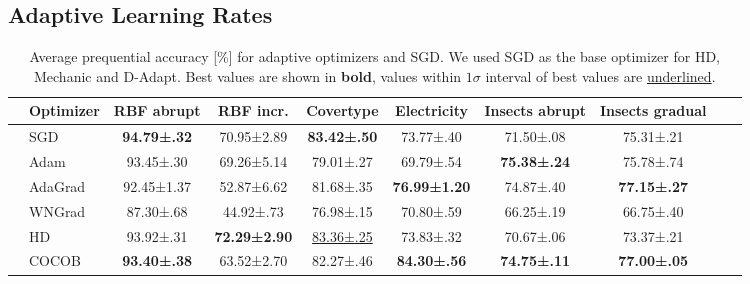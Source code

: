 \documentclass[runningheads]{llncs}
\begin{document}
\subsection{Adaptive Learning Rates}

\begin{table}[ht]
	\centering
	\scriptsize
	\caption{Average prequential accuracy [\%] for adaptive optimizers and SGD. We used SGD as the base optimizer for HD, Mechanic and D-Adapt. Best values are shown in \textbf{bold}, values within $1\sigma$ interval of best values are \underline{underlined}.}
	\begin{tabular}{llcccccccc}
		\toprule
		                                                   & Optimizer                                                                         & RBF abrupt          & RBF incr.            & Covertype             & Electricity          & Insects abrupt      & Insects gradual     \\
		\midrule
		\multirow{5}{*}{\rotatebox[origin=c]{90}{Tuned}}   & SGD                                                                               & \bfseries 94.79±.32 & 70.95±2.89           & \bfseries 83.42±.50   & 73.77±.40            & 71.50±.08           & 75.31±.21           \\
		                                                   & Adam \cite{kingmaAdamMethodStochastic2017b}                                       & 93.45±.30           & 69.26±5.14           & 79.01±.27             & 69.79±.54            & \bfseries 75.38±.24 & 75.78±.74           \\
		                                                   & AdaGrad \cite{duchiAdaptiveSubgradientMethods2011}                                & 92.45±1.37          & 52.87±6.62           & 81.68±.35             & \bfseries 76.99±1.20 & 74.87±.40           & \bfseries 77.15±.27 \\
		                                                   & WNGrad  \cite{wuWNGradLearnLearning2020}                                          & 87.30±.68           & 44.92±.73            & 76.98±.15             & 70.80±.59            & 66.25±.19           & 66.75±.40           \\
		                                                   & HD \cite{baydinOnlineLearningRate2018}                                            & 93.92±.31           & \bfseries 72.29±2.90 & \underline{83.36±.25} & 73.83±.32            & 70.67±.06           & 73.37±.21           \\ \midrule
		\multirow{4}{*}{\rotatebox[origin=c]{90}{LR-Free}} & COCOB                               \cite{orabonaTrainingDeepNetworks2017}        & \bfseries 93.40±.38 & 63.52±2.70           & 82.27±.46             & \bfseries 84.30±.56  & \bfseries 74.75±.11 & \bfseries 77.00±.05 \\

\end{tabular}
\end{table}
\end{document}
